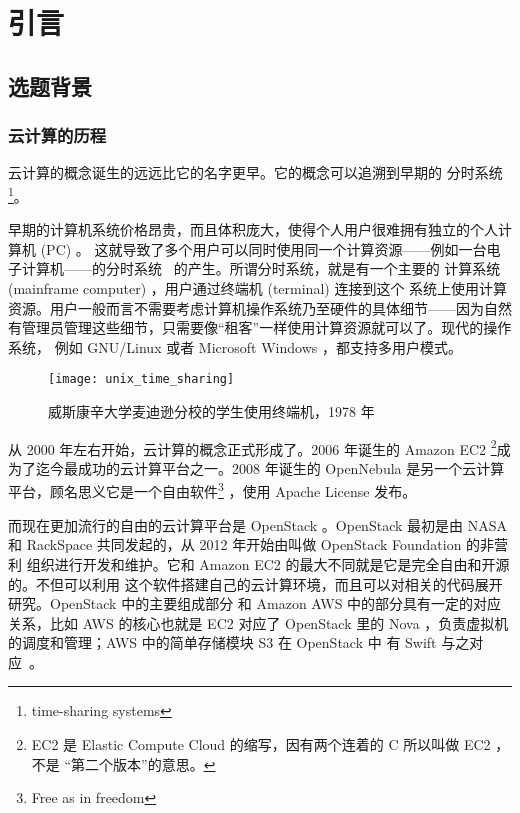 \chapter{引言}
\label{cha:intro}

\section{选题背景}

\subsection{云计算的历程}

云计算的概念诞生的远远比它的名字更早。它的概念可以追溯到早期的
分时系统\footnote{time-sharing systems}。

早期的计算机系统价格昂贵，而且体积庞大，使得个人用户很难拥有独立的个人计算机 (PC) 。
这就导致了多个用户可以同时使用同一个计算资源——例如一台电子计算机——的分时系统
~\cite{timesharing}的产生。所谓分时系统，就是有一个主要的
计算系统 (mainframe computer) ，用户通过终端机 (terminal) 连接到这个
系统上使用计算资源。用户一般而言不需要考虑计算机操作系统乃至硬件的具体细节——因为自然
有管理员管理这些细节，只需要像“租客”一样使用计算资源就可以了。现代的操作系统，
例如 GNU/Linux 或者 Microsoft Windows ，都支持多用户模式。

\begin{figure}[h]
    \centering
    \texttt{[image: unix\_time\_sharing]}
    \caption{威斯康辛大学麦迪逊分校的学生使用终端机，1978 年}
\end{figure}

从 2000 年左右开始，云计算的概念正式形成了。2006 年诞生的 Amazon EC2 \footnote{EC2
  是 Elastic Compute Cloud 的缩写，因有两个连着的 C 所以叫做 EC2 ，不是
  “第二个版本”的意思。}成为了迄今最成功的云计算平台之一。2008 年诞生的 OpenNebula
是另一个云计算平台，顾名思义它是一个自由软件\footnote{Free as in freedom}
，使用 Apache License 发布。

而现在更加流行的自由的云计算平台是 OpenStack 。OpenStack 最初是由
 NASA 和 RackSpace 共同发起的，从 2012 年开始由叫做 OpenStack Foundation 的非营利
组织进行开发和维护。它和 Amazon EC2 的最大不同就是它是完全自由和开源的。不但可以利用
这个软件搭建自己的云计算环境，而且可以对相关的代码展开研究。OpenStack 中的主要组成部分
和 Amazon AWS 中的部分具有一定的对应关系，比如 AWS 的核心也就是 EC2 对应了 OpenStack
 里的 Nova ，负责虚拟机的调度和管理；AWS 中的简单存储模块 S3 在 OpenStack 中
有 Swift 与之对应~\cite{openstack}。

